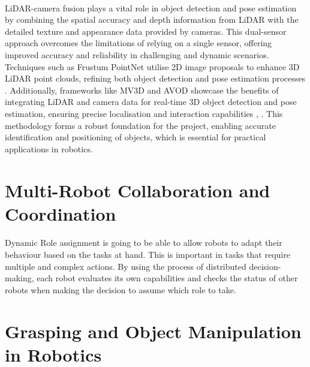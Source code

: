 \paragraph*{}
LiDAR-camera fusion plays a vital role in object detection and pose estimation by combining the spatial accuracy and depth information from LiDAR with the detailed texture and appearance data provided by cameras. This dual-sensor approach overcomes the limitations of relying on a single sensor, offering improved accuracy and reliability in challenging and dynamic scenarios. Techniques such as Frustum PointNet utilise 2D image proposals to enhance 3D LiDAR point clouds, refining both object detection and pose estimation processes \cite{qi2018frustumpointnet}. Additionally, frameworks like MV3D and AVOD showcase the benefits of integrating LiDAR and camera data for real-time 3D object detection and pose estimation, ensuring precise localisation and interaction capabilities \cite{ku2018mv3d}, \cite{chen2017avod}. This methodology forms a robust foundation for the project, enabling accurate identification and positioning of objects, which is essential for practical applications in robotics.

\section{Multi-Robot Collaboration and Coordination}

\paragraph*{}
Dynamic Role assignment is going to be able to allow robots to adapt their behaviour based on the tasks at hand. This is important in tasks that require multiple and complex actions. By using the process of distributed decision-making, each robot evaluates its own capabilities and checks the status of other robots when making the decision to assume which role to take\cite{parker1998alliance}.

\section{Grasping and Object Manipulation in Robotics}

